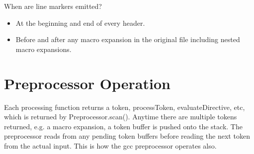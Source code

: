 \documentclass{report}
\begin{document}
When are line markers emitted?

\begin{itemize}
\item At the beginning and end of every header.
\item Before and after any macro expansion in the original file
  including nested macro expansions.
\end{itemize}



\section{Preprocessor Operation}

Each processing function returns a token, processToken,
evaluateDirective, etc, which is returned by Preprocessor.scan().
Anytime there are multiple tokens returned, e.g. a macro expansion, a
token buffer is pushed onto the stack.  The preprocessor reads from
any pending token buffers before reading the next token from the
actual input.  This is how the gcc preprocessor operates also.
\end{document}
